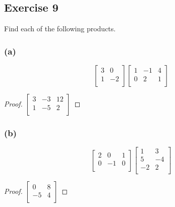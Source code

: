 \documentclass[14pt]{extarticle}
\begin{document}
\subsection{Exercise 9}
Find each of the following products.

\subsubsection{(a)}
\[
    \left[
        \begin{array}{rr}
            3 & 0  \\
            1 & -2 \\
        \end{array}
        \right]
    \left[
        \begin{array}{rrr}
            1 & -1 & 4 \\
            0 & 2  & 1 \\
        \end{array}
        \right]
\]
\begin{proof}
    \(\left[
        \begin{array}{rrr}
            3 & -3 & 12 \\
            1 & -5 & 2  \\
        \end{array}
        \right]\)
\end{proof}

\subsubsection{(b)}
\[
    \left[
        \begin{array}{rrr}
            2 & 0  & 1 \\
            0 & -1 & 0 \\
        \end{array}
        \right]
    \left[
        \begin{array}{rr}
            1  & 3  \\
            5  & -4 \\
            -2 & 2  \\
        \end{array}
        \right]
\]
\begin{proof}
    \(\left[
        \begin{array}{rr}
            0  & 8 \\
            -5 & 4 \\
        \end{array}
        \right]\)
\end{proof}
\end{document}
